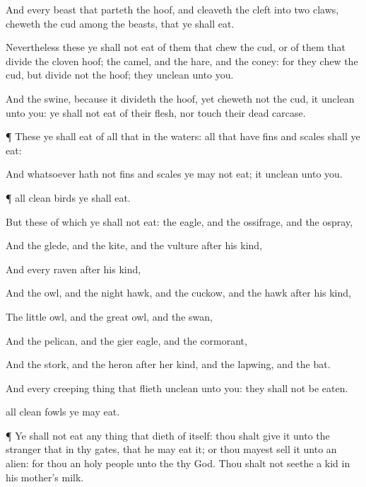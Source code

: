 {And every
beast that
parteth the
hoof, and
cleaveth the
cleft into
two
claws,
{}
cheweth the
cud among the
beasts, that ye shall
eat.

Nevertheless these ye shall not
eat of them that
chew the
cud, or of them that
divide the
cloven
hoof;
{} the
camel, and the
hare, and the
coney: for they
chew the
cud, but
divide not the
hoof;
{} they
{}
unclean unto you.

And the
swine, because it
divideth the
hoof, yet cheweth not the
cud, it
{}
unclean unto you: ye shall not
eat of their
flesh, nor
touch their dead
carcase.


\par }{\PP {}¶ These ye shall
eat of all that
{} in the
waters: all that have
fins and
scales shall ye
eat:

And whatsoever hath not
fins and
scales ye may not
eat; it
{}
unclean unto you.


\par }{\PP {}¶
{} all
clean
birds ye shall
eat.

But these
{} of which ye shall not
eat: the
eagle, and the
ossifrage, and the
ospray,

And the
glede, and the
kite, and the
vulture after his
kind,

And every
raven after his
kind,

And the
owl, and the night
hawk, and the
cuckow, and the
hawk after his
kind,

The little
owl, and the great
owl, and the
swan,

And the
pelican, and the gier
eagle, and the
cormorant,

And the
stork, and the
heron after her
kind, and the
lapwing, and the
bat.

And every creeping
thing that
flieth
{}
unclean unto you: they shall not be
eaten.

 all
clean
fowls ye may
eat.


\par }{\PP {}¶ Ye shall not
eat
{} any thing that dieth of
itself: thou shalt
give it unto the
stranger that
{} in thy
gates, that he may
eat it; or thou mayest
sell it unto an
alien: for thou
{} an
holy
people unto the
{} thy
God. Thou shalt not
seethe a
kid in his
mother’s
milk.


}
